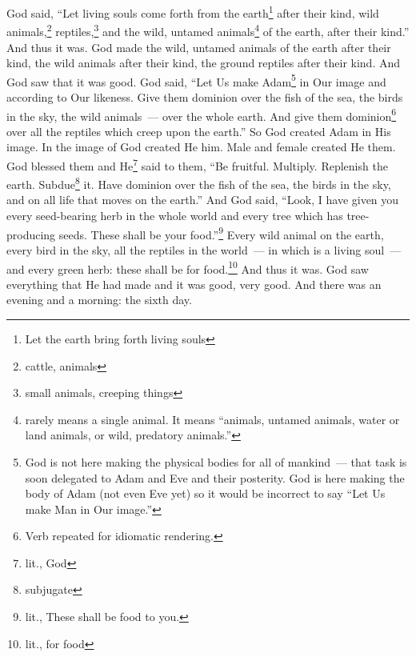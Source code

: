 \begin{inparaenum}
     God said, ``Let living souls come forth from the earth\footnote{Let the earth bring forth living souls} after their kind, wild animals,\footnote{cattle, animals} reptiles,\footnote{small animals, creeping things} and the wild, untamed animals\footnote{ rarely means a single animal. It means ``animals, untamed animals, water or land animals, or wild, predatory animals.''} of the earth, after their kind.'' And thus it was.%
     God made the wild, untamed animals of the earth after their kind, the wild animals after their kind, the ground reptiles after their kind. And God saw that it was good.%
     God said, ``Let Us make Adam\footnote{God is not here making the physical bodies for all of mankind~--- that task is soon delegated to Adam and Eve and their posterity. God is here making the body of Adam (not even Eve yet) so it would be incorrect to say ``Let Us make Man in Our image.''} in Our image and according to Our likeness. Give them dominion over the fish of the sea, the birds in the sky, the wild animals~--- over the whole earth. And give them dominion\footnote{Verb repeated for idiomatic rendering.} over all the reptiles which creep upon the earth.''%
     So God created Adam in His image. In the image of God created He him. Male and female created He them.%
     God blessed them and He\footnote{lit., God} said to them, ``Be fruitful. Multiply. Replenish the earth. Subdue\footnote{subjugate} it. Have dominion over the fish of the sea, the birds in the sky, and on all life that moves on the earth.''%
     And God said, ``Look, I have given you every seed-bearing herb in the whole world and every tree which has tree-producing seeds. These shall be your food.''\footnote{lit., These shall be food to you.}%
     Every wild animal on the earth, every bird in the sky, all the reptiles in the world~--- in which is a living soul~--- and every green herb: these shall be for food.\footnote{lit., for food} And thus it was.%
     God saw everything that He had made and it was good, very good. And there was an evening and a morning: the sixth day.%
\end{inparaenum}
